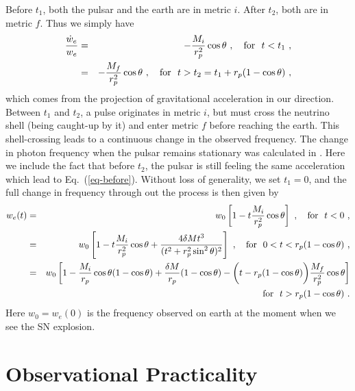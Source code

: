 \documentclass[aps,showpacs,onecolumn,floats,prd,superscriptaddress,nofootinbib]{revtex4}
\begin{document}
Before $t_1$, both the pulsar and the earth are in metric $i$. After $t_2$, both are in metric $f$. Thus we simply have
\begin{eqnarray}
\frac{\dot{w}_e}{w_e} &=& -\frac{M_i}{r_p^2}\cos\theta~, \ \ \ {\rm for} \ \ t<t_1~,
\label{eq-before} \\
&=& -\frac{M_f}{r_p^2}\cos\theta~, \ \ \ {\rm for} \ \ t>t_2 = t_1 + r_p(1-\cos\theta)~,
\end{eqnarray}
which comes from the projection of gravitational acceleration in our direction. Between $t_1$ and $t_2$, a pulse originates in metric $i$, but must cross the neutrino shell (being caught-up by it) and enter metric $f$ before reaching the earth. This shell-crossing leads to a continuous change in the observed frequency. The change in photon frequency when the pulsar remains stationary was calculated in \cite{OluPie13}. Here we include the fact that before $t_2$, the pulsar is still feeling the same acceleration which lead to Eq.~(\ref{eq-before}). Without loss of generality, we set $t_1=0$, and the full change in frequency through out the process is then given by
\begin{eqnarray}
w_e(t) &=& w_0 \left[ 1 -  t\frac{M_i}{r_p^2}\cos\theta \right]~, 
\ \ \ {\rm for} \ \ t < 0~, \label{eq-beforeW}  \\
&=& w_0
\left[ 1 -  t\frac{M_i}{r_p^2}\cos\theta + \frac{4\delta M t^3}{(t^2 + r_p^2\sin^2\theta)^2} \right]~, 
\ \ \ {\rm for} \ \ 0 < t <  r_p(1 - \cos\theta)~, \\
&=& w_0
\left[ 1-\frac{M_i}{r_p}\cos\theta(1-\cos\theta) + \frac{\delta M}{r_p}(1-\cos\theta) -  \bigg(t-r_p(1-\cos\theta)\bigg) \frac{M_f}{r_p^2}\cos\theta \right] \nonumber \\
& & {\rm for} \ \ t > r_p(1-\cos\theta)~.
\end{eqnarray}
Here $w_0 = w_e(0)$ is the frequency observed on earth at the moment when we see the SN explosion. 

\section{Observational Practicality}
\label{sec-obs}
\end{document}
